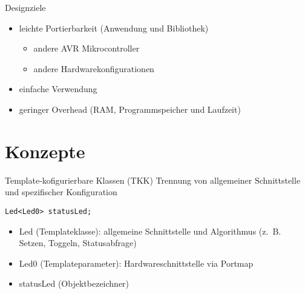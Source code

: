 \documentclass[11pt]{beamer}
\begin{document}
\begin{frame}{Designziele}
	\begin{itemize}
		\item leichte Portierbarkeit (Anwendung und Bibliothek)
			\begin{itemize}
				\item andere AVR Mikrocontroller
				\item andere Hardwarekonfigurationen %
			\end{itemize}
		\item einfache Verwendung
		\item geringer Overhead (RAM, Programmspeicher und Laufzeit)
	\end{itemize}
\end{frame}

\section{Konzepte}

\begin{frame}[fragile]{Template-kofigurierbare Klassen (TKK)}
Trennung von allgemeiner Schnittstelle und spezifischer Konfiguration

\begin{lstlisting}
Led<Led0> statusLed;
\end{lstlisting}

\begin{itemize}
	\item Led (Templateklasse): allgemeine Schnittstelle und Algorithmus (z.~B. Setzen, Toggeln, Statusabfrage)
	\item Led0 (Templateparameter): Hardwareschnittstelle via Portmap
	\item statusLed (Objektbezeichner)
\end{itemize}
		

\end{frame}
\end{document}
